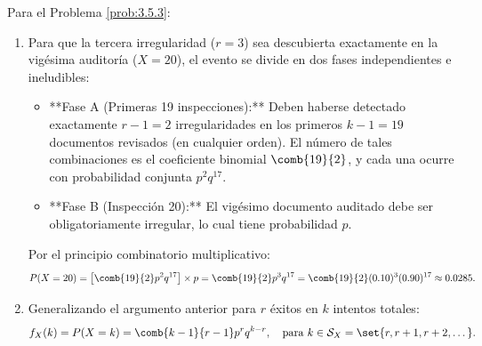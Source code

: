 \begin{solucion}
	\label{sol:3.5.3}
	Para el Problema \ref{prob:3.5.3}:
	\begin{enumerate}
		\item Para que la tercera irregularidad ($r=3$) sea descubierta exactamente en la vigésima auditoría ($X=20$), el evento se divide en dos fases independientes e ineludibles:
		\begin{itemize}
			\item **Fase A (Primeras 19 inspecciones):** Deben haberse detectado exactamente $r-1 = 2$ irregularidades en los primeros $k-1 = 19$ documentos revisados (en cualquier orden). El número de tales combinaciones es el coeficiente binomial $\comb{19}{2}$, y cada una ocurre con probabilidad conjunta $p^2 q^{17}$.
			\item **Fase B (Inspección 20):** El vigésimo documento auditado debe ser obligatoriamente irregular, lo cual tiene probabilidad $p$.
		\end{itemize}
		Por el principio combinatorio multiplicativo:
		\begin{align*}
			P(X = 20) = \left[\comb{19}{2} p^2 q^{17}\right] \times p = \comb{19}{2} p^3 q^{17} = \comb{19}{2} (0.10)^3 (0.90)^{17} \approx 0.0285.
		\end{align*}
		\item Generalizando el argumento anterior para $r$ éxitos en $k$ intentos totales:
		\begin{align*}
			f_X(k) = P(X = k) = \comb{k-1}{r-1} p^r q^{k-r}, \quad \text{para } k \in \mathcal{S}_X = \set{r, r+1, r+2, \dots}.
		\end{align*}
	\end{enumerate}
\end{solucion}

